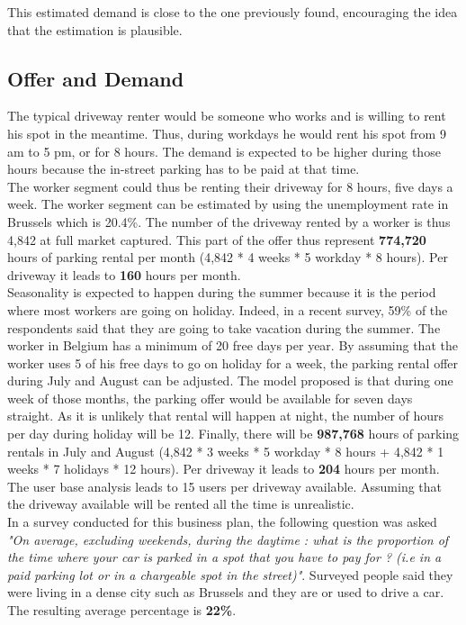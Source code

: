 \documentclass[12pt,a4paper,oneside]{book}
\begin{document}
This estimated demand is close to the one previously found, encouraging the idea that the estimation is plausible.\\

\subsection{Offer and Demand}

The typical driveway renter would be someone who works and is willing to rent his spot in the meantime. Thus, during workdays he would rent his spot from 9 am to 5 pm, or for 8 hours. The demand is expected to be higher during those hours because the in-street parking has to be paid at that time.\\

The worker segment could thus be renting their driveway for 8 hours, five days a week. The worker segment can be estimated by using the unemployment rate in Brussels which is 20.4\%. The number of the driveway rented by a worker is thus 4,842 at full market captured. This part of the offer thus represent \textbf{774,720} hours of parking rental per month (4,842 * 4 weeks * 5 workday * 8 hours). Per driveway it leads to \textbf{160} hours per month.\\

Seasonality is expected to happen during the summer because it is the period where most workers are going on holiday. Indeed, in a recent survey, 59\% of the respondents said that they are going to take vacation during the summer. The worker in Belgium has a minimum of 20 free days per year.\cite{hdbe} By assuming that the worker uses 5 of his free days to go on holiday for a week, the parking rental offer during July and August can be adjusted. The model proposed is that during one week of those months, the parking offer would be available for seven days straight. As it is unlikely that rental will happen at night, the number of hours per day during holiday will be 12. Finally, there will be \textbf{987,768} hours of parking rentals in July and August (4,842 * 3 weeks * 5 workday * 8 hours + 4,842 * 1 weeks * 7 holidays * 12 hours). Per driveway it leads to \textbf{204} hours per month.\\

The user base analysis leads to 15 users per driveway available. Assuming that the driveway available will be rented all the time is unrealistic.\\

In a survey conducted for this business plan, the following question was asked \textit{"On average, excluding weekends, during the daytime : what is the proportion of the time where your car is parked in a spot that you have to pay for ? (i.e in a paid parking lot or in a chargeable spot in the street)"}. Surveyed people said they were living in a dense city such as Brussels and they are or used to drive a car. The resulting average percentage is \textbf{22\%}.\\
\end{document}
